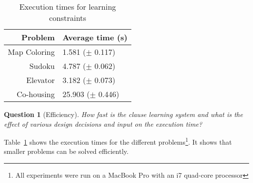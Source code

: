 \documentclass[letterpaper]{article}
\newtheorem{question}{Question}
\theoremstyle{definition}
\begin{document}
\begin{table}
  \caption{Execution times for learning constraints}
  \begin{tabularx}{\linewidth}{r|X}

\textbf{Problem}    & \textbf{Average time (s)} \\ %
\toprule
Map Coloring        & 1.581   ($\pm$ 0.117)     \\ %
Sudoku              & 4.787   ($\pm$ 0.062)     \\ %
Elevator            & 3.182   ($\pm$ 0.073)     \\ %
Co-housing          & 25.903  ($\pm$ 0.446)      %
  \end{tabularx}
  \label{tbl:uitvoering}
\end{table}

\begin{question}[Efficiency]
  How fast is the clause learning system and what is the effect of various design decisions and input on the execution time?
\end{question}

Table~\ref{tbl:uitvoering} shows the execution times for the different problems\footnote{All experiments were run on a MacBook Pro with an i7 quad-core processor}.
It shows that smaller problems can be solved efficiently.
\end{document}
